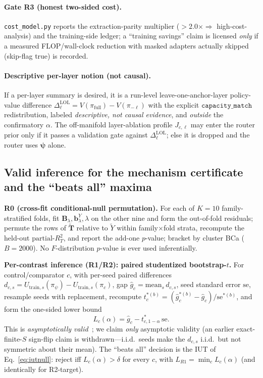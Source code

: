 \documentclass[11pt]{article}
\theoremstyle{definition}
\newcommand{\Ttil}{\widetilde{\mathbf{T}}}
\newcommand{\Blam}{\mathbf{B}_{\lambda}}
\newcommand{\psivec}{\bm{\psi}}
\newcommand{\Vpol}{V}
\begin{document}
\paragraph{Gate R3 (honest two-sided cost).} \texttt{cost\_model.py} reports the
extraction-parity multiplier ($>2.0\times\Rightarrow$ high-cost-analysis) and the
training-side ledger; a ``training savings'' claim is licensed \emph{only} if a measured
FLOP/wall-clock reduction with masked adapters actually skipped (skip-flag true) is
recorded.

\paragraph{Descriptive per-layer notion (not causal).} If a per-layer summary is desired,
it is a run-level leave-one-anchor-layer policy-value difference $\Delta_\ell^{\mathrm{LOL}}
=\Vpol(\pi_{\mathrm{full}})-\Vpol(\pi_{-\ell})$ with the explicit $\texttt{capacity\_match}$
redistribution, labeled \emph{descriptive, not causal evidence}, and \emph{outside} the
confirmatory $\alpha$. The off-manifold layer-ablation profile $J_{c,\ell}$ may enter the
router prior only if it passes a validation gate against $\Delta_\ell^{\mathrm{LOL}}$; else
it is dropped and the router uses $\psivec$ alone.

\subsection{Valid inference for the mechanism certificate and the ``beats all'' maxima}
\label{sec:inference}
\textbf{R0 (cross-fit conditional-null permutation).} For each of $K{=}10$
family-stratified folds, fit $\Blam,\mathbf b_\lambda^{Y},\lambda$ on the other nine and
form the out-of-fold residuals; permute the rows of $\Ttil$ relative to $\widetilde Y$
within family$\times$fold strata, recompute the held-out $\mathrm{partial\text{-}}R^2_T$,
and report the add-one $p$-value; bracket by cluster BCa ($B{=}2000$). No
$F$-distribution $p$-value is ever used inferentially.

\noindent\textbf{Per-contrast inference (R1/R2): paired studentized bootstrap-$t$.} For
control/comparator $c$, with per-seed paired differences $d_{c,s}=U_{\mathrm{train},s}(\pi_\psi)-
U_{\mathrm{train},s}(\pi_c)$, gap $\hat g_c=\mathrm{mean}_s\,d_{c,s}$, seed standard error
$\mathrm{se}$, resample seeds with replacement, recompute $t_c^{*(b)}=(\hat g_c^{*(b)}-\hat
g_c)/\mathrm{se}^{*(b)}$, and form the one-sided lower bound
\begin{equation}
L_c(\alpha)=\hat g_c-t^{*}_{c,1-\alpha}\,\mathrm{se}.
\label{eq:Lc}
\end{equation}
This is \emph{asymptotically valid}~\cite{hall1988bootstrap}; we claim \emph{only}
asymptotic validity (an earlier exact-finite-$S$ sign-flip claim is withdrawn---i.i.d.\
seeds make the $d_{c,s}$ i.i.d.\ but not symmetric about their mean). The ``beats all''
decision is the IUT of Eq.~\eqref{eq:iutnull}: reject iff $L_c(\alpha)>\delta$ for every
$c$, with $L_{R1}=\min_c L_c(\alpha)$ (and identically for R2-target).
\end{document}
